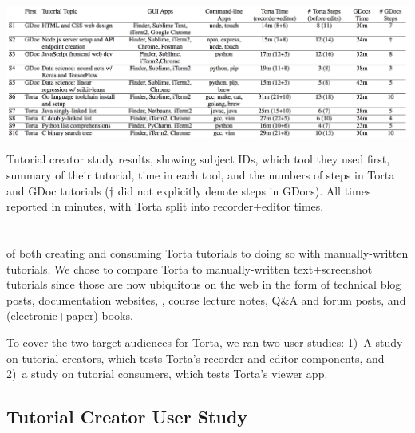 % 

\begin{table}
  \label{tab:creator-study}
  \includegraphics[width=\linewidth]{figures/torta/tbl_eval.png}
  \caption{Tutorial creator study results, showing subject IDs, which tool they used first, summary of their tutorial, time in each tool, and the numbers of steps in Torta and GDoc tutorials ($\dagger$ did not explicitly denote steps in GDocs). All times reported in minutes, with Torta split into recorder+editor times.}
\end{table}

\section{}

 of both creating and consuming Torta tutorials to doing
so with manually-written tutorials. We chose to  compare Torta to manually-written
text+screenshot tutorials since those are now ubiquitous on the web in the
form of technical blog posts, documentation websites, , course lecture
notes, Q\&A and forum posts, and (electronic+paper) books.
%

To cover the two target audiences for Torta, we ran two  user studies:
1)~A study on tutorial creators, which tests Torta's recorder and
editor components, and 2)~a study on tutorial consumers, which tests Torta's viewer app.


\subsection{Tutorial Creator User Study}

